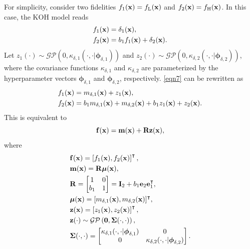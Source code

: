 \documentclass[iicol,sn-basic]{sn-jnl}%
\begin{document}
For simplicity, consider two fidelities $f_{1}({\bf x})=f_\text{L}({\bf x})$ and $f_{2}({\bf x})=f_\text{H}({\bf x})$.
In this case, the KOH model reads
\begin{subequations}\label{eqn7}
	\begin{align}
		f_1({\bf x}) & = \delta_1({\bf x}) 
		\label{eqn7-1},\\
		f_2({\bf x}) & = b_{1} f_{1}({\bf x}) + \delta_2({\bf x})
		\label{eqn7-2}.
	\end{align}
\end{subequations}
Let $z_1({\cdot}) \sim \mathcal{GP}\left(0,\kappa_{\delta,1}(\cdot,\cdot|{\boldsymbol \phi}_{\delta,1})\right)$ and $z_2({\cdot}) \sim \mathcal{GP}\left(0,\kappa_{\delta,2}(\cdot,\cdot|{\boldsymbol \phi}_{\delta,2})\right)$, where the covariance functions $\kappa_{\delta,1}$ and $\kappa_{\delta,2}$ are parameterized by the hyperparameter vectors ${\boldsymbol \phi}_{\delta,1}$ and ${\boldsymbol \phi}_{\delta,2}$, respectively.
\cref{eqn7} can be rewritten as
\begin{subequations}\label{eqn8}
	\begin{align}
		f_1({\bf x}) & = m_{\delta,1}({\bf x}) + z_1({\bf x}) 
		\label{eqn8-1},\\
		f_2({\bf x}) & = b_1  m_{\delta,1}({\bf x}) + m_{\delta,2}({\bf x}) + b_1 z_1({\bf x}) + z_2({\bf x})
		\label{eqn8-2}.
	\end{align}
\end{subequations}
This is equivalent to
\begin{equation}\label{eqn9}
	{\bf f}({\bf x}) =  {\bf m}({\bf x}) + {\bf R} {\bf z}({\bf x}),
\end{equation}
where
\begin{subequations}\label{eqn10}
	\begin{align}
		&{\bf f}({\bf x}) = \left[f_1({\bf x}),f_2({\bf x})\right]^\intercal 
		\label{eqn10-1},\\
		& {\bf m}({\bf x}) = {\bf R} \boldsymbol{\mu}({\bf x}), \label{eqn10-2}\\
		& {\bf R} = \left[\begin{matrix}
			1 & 0 \\
			b_1 & 1
		\end{matrix}\right] = {\bf I}_2 + b_1 {\bf e}_2 {\bf e}^\intercal_1, \label{eqn10-3}\\
		& \boldsymbol{\mu}({\bf x}) = [m_{\delta,1}({\bf x}),m_{\delta,2}({\bf x})]^\intercal,
		\label{eqn10-4}\\
		& {\bf z}({\bf x}) = \left[z_1({\bf x}),z_2({\bf x})\right]^\intercal, \label{eqn10-5}\\
		& {\bf z}(\cdot) \sim \mathcal{GP}\left({\bf 0},{\boldsymbol \Sigma}(\cdot,\cdot)\right),
		\label{eqn10-6}\\
		&{\boldsymbol \Sigma}(\cdot,\cdot) = \left[\begin{matrix}
			\kappa_{\delta,1}(\cdot,\cdot|{\boldsymbol \phi}_{\delta,1}) & 0 \\
			0 & \kappa_{\delta,2}(\cdot,\cdot|{\boldsymbol \phi}_{\delta,2})
		\end{matrix}\right] \label{eqn10-7}.
	\end{align}
\end{subequations}
\end{document}
